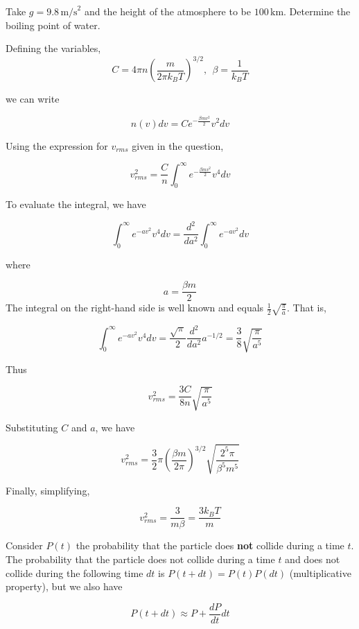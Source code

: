 \documentclass[11pt]{article}
\begin{document}
\begin{pproblem}
\begin{alternativas}
\item Take $g = 9.8 \, \text{m/s}^2$ and the height of the atmosphere to be $100 \, \text{km}$. Determine the boiling point of water.

\end{alternativas}

\begin{pssolution*}{}{}
    \begin{alternativas}
    \item Defining the variables,
    \[C = 4\pi n \left(\frac{m}{2\pi k_B T}\right)^{3/2}, \ \ \beta = \frac{1}{k_BT}\]

    we can write

    \[n(v)dv = C e^{-\frac{\beta mv^2}{2}}v^2dv\]

    Using the expression for \(v_{rms}\) given in the question,

    \[v_{rms}^2 = \frac{C}{n}\int_0^\infty  e^{-\frac{\beta mv^2}{2}}v^4 dv\]

    To evaluate the integral, we have

    \[\int_0^{\infty} e^{-av^2}v^4 dv = \frac{d^2}{da^2}\int_0^{\infty} e^{-av^2}dv\] 

    where

    \[a = \frac{\beta m}{2}\]
    The integral on the right-hand side is well known and equals \(\frac{1}{2}\sqrt{\frac{\pi}{a}}\). That is,

    \[\int_0^{\infty} e^{-av^2}v^4 dv = \frac{\sqrt{\pi}}{2}\frac{d^2}{da^2}a^{-1/2} = \frac{3}{8}\sqrt{\frac{\pi}{a^5}}\]

    Thus

    \[v_{rms}^2 = \frac{3C}{8n}\sqrt{\frac{\pi}{a^5}}\]

    Substituting \(C\) and \(a\), we have

    \[v_{rms}^2 = \frac{3}{2}\pi  \left(\frac{\beta m}{2\pi}\right)^{3/2}\sqrt{\frac{2^5\pi}{\beta^5m^5}}\]
    
    Finally, simplifying,

    \[\boxed{v_{rms}^2 = \frac{3}{m\beta} = \frac{3k_B T}{m}}\]

    \item Consider \(P(t)\) the probability that the particle does \textbf{not} collide during a time \(t\). The probability that the particle does not collide during a time \(t\) and does not collide during the following time \(dt\) is \(P(t+dt) = P(t)P(dt)\) (multiplicative property), but we also have
    
    \[P(t+dt) \approx P + \frac{dP}{dt}dt\]


\end{alternativas}
\end{pssolution*}
\end{pproblem}
\end{document}
